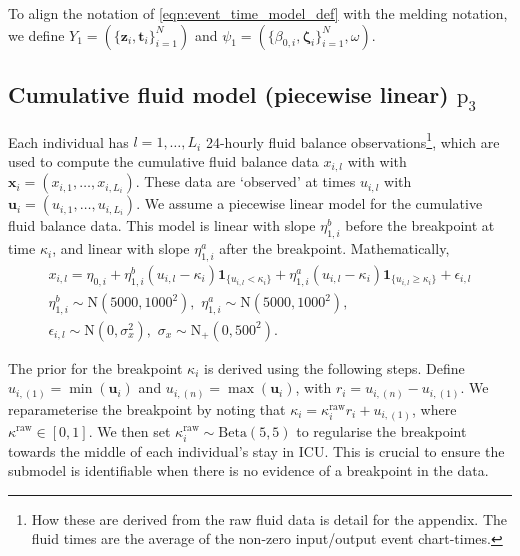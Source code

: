 \documentclass[
  10pt,
  a4paper,
]{article}
\newcommand{\pd}{\text{p}}
\begin{document}
To align the notation of \eqref{eqn:event_time_model_def} with the
melding notation, we define
\(Y_{1} = (\{\boldsymbol{z}_{i}, \boldsymbol{t}_{i}\}_{i = 1}^{N})\) and
\(\psi_{1} = (\{\beta_{0, i}, \boldsymbol{\zeta}_{i}\}_{i = 1}^{N}, \omega)\).

\hypertarget{cumulative-fluid-model-piecewise-linear-pd_3}{%
\subsection{\texorpdfstring{Cumulative fluid model (piecewise linear)
\(\pd_{3}\)}{Cumulative fluid model (piecewise linear) \textbackslash pd\_\{3\}}}\label{cumulative-fluid-model-piecewise-linear-pd_3}}

Each individual has \(l = 1, \ldots, L_{i}\) 24-hourly fluid balance
observations\footnote{How these are derived from the raw fluid data is
  detail for the appendix. The fluid times are the average of the
  non-zero input/output event chart-times.}, which are used to compute
the cumulative fluid balance data \(x_{i, l}\) with with
\(\boldsymbol{x}_{i} = (x_{i, 1}, \ldots, x_{i, L_{i}})\). These data
are `observed' at times \(u_{i, l}\) with
\(\boldsymbol{u}_{i} = (u_{i, 1}, \ldots, u_{i, L_{i}})\). We assume a
piecewise linear model for the cumulative fluid balance data. This model
is linear with slope \(\eta_{1, i}^{b}\) before the breakpoint at time
\(\kappa_{i}\), and linear with slope \(\eta_{1, i}^{a}\) after the
breakpoint. Mathematically, \begin{gather}
  x_{i, l} = \eta_{0, i} + \eta^{b}_{1, i}(u_{i, l} - \kappa_{i})\boldsymbol{1}_{\{u_{i, l} < \kappa_{i}\}} + \eta^{a}_{1, i}(u_{i, l} - \kappa_{i})\boldsymbol{1}_{\{u_{i, l} \geq \kappa_{i}\}} + \epsilon_{i, l}
  \label{eqn:piecewise-fluid-model-one}\\
  \eta^{b}_{1, i} \sim \text{N}(5000, 1000^2), \,\, \eta^{a}_{1, i} \sim \text{N}(5000, 1000^2), \\
  \epsilon_{i, l} \sim \text{N}(0, \sigma^{2}_{x}),  \,\, \sigma_{x} \sim \text{N}_{+}(0, 500^2).
\end{gather}

The prior for the breakpoint \(\kappa_{i}\) is derived using the
following steps. Define \(u_{i, (1)} = \min(\boldsymbol{u}_{i})\) and
\(u_{i, (n)} = \max(\boldsymbol{u}_{i})\), with
\(r_{i} = u_{i, (n)} - u_{i, (1)}\). We reparameterise the breakpoint by
noting that \(\kappa_{i} = \kappa^{\text{raw}}_{i}r_{i} + u_{i, (1)}\),
where \(\kappa^{\text{raw}} \in [0, 1]\). We then set
\(\kappa^{\text{raw}}_{i} \sim \text{Beta}(5, 5)\) to regularise the
breakpoint towards the middle of each individual's stay in ICU. This is
crucial to ensure the submodel is identifiable when there is no evidence
of a breakpoint in the data.
\end{document}

